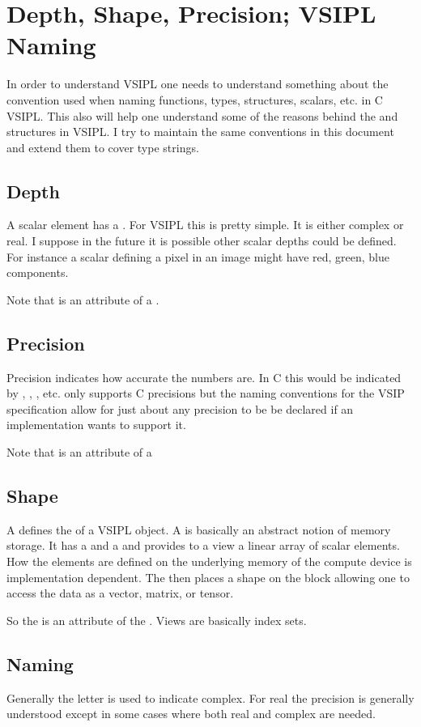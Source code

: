\clearpage
\section*{Depth, Shape, Precision; VSIPL Naming}
In order to understand VSIPL one needs to understand something about the convention used when naming functions, types, structures, scalars, etc. in C VSIPL. This also will help one understand some of the reasons behind the  and  structures in VSIPL. I try to maintain the same conventions in this document and extend them to cover \pyjv type strings.

\subsection*{Depth}
A scalar element has a .  For VSIPL this is pretty simple.  It is either complex or real. I suppose in the future it is possible other scalar depths could be defined. For instance a scalar defining a pixel in an image might have red, green, blue components. 

Note that  is an attribute of a . 

\subsection*{Precision}
Precision indicates how accurate the numbers are. In C this would be indicated by , , , etc. \jv only supports C precisions but the naming conventions for the VSIP specification allow for just about any precision to be be declared if an implementation wants to support it.

Note that  is an attribute of a 

\subsection*{Shape}
A  defines the  of a VSIPL object. A  is basically an abstract notion of memory storage. It has a  and a  and provides to a view a linear array of scalar elements.  How the elements are defined on the underlying memory of the compute device is implementation dependent. The  then places a shape on the block allowing one to access the data as a vector, matrix, or tensor. 

So the  is an attribute of the . Views are basically index sets.

\subsection*{Naming}
Generally the letter  is used to indicate complex. For real the precision is generally understood except in some cases where both real and complex are needed. 